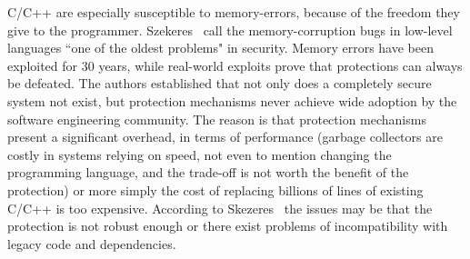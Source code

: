 \documentclass[nomenclature, english, bibtex]{kththesis}
\begin{document}
C/C++ are especially susceptible to \gls{memory-error}s, because of the freedom they give to the programmer. Szekeres \etal\,\cite{szekeres_sok_2013} call the \gls{memory-corruption} bugs in low-level languages ``one of the oldest problems" in security. Memory errors have been exploited for 30 years, while real-world exploits prove that protections can always be defeated. The authors established that not only does a completely secure system not exist, but protection mechanisms never achieve wide adoption by the software engineering community. The reason is that protection mechanisms present a significant overhead, in terms of performance (\eg garbage collectors are costly in systems relying on speed, not even to mention changing the programming language, and the trade-off is not worth the benefit of the protection) or more simply the cost of replacing billions of lines of existing C/C++ is too expensive. According to Skezeres \etal\,\cite{szekeres_sok_2013} the issues may be that the protection is not robust enough or there exist problems of incompatibility with legacy code and dependencies.

\end{document}
